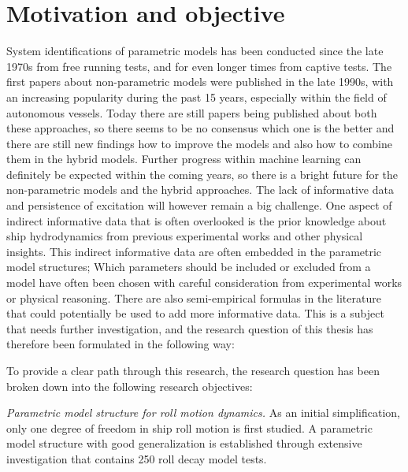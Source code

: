 \section{Motivation and objective}
\label{sec:motivation}
System identifications of parametric models has been conducted since the late 1970s from free running tests, and for even longer times from captive tests. The first papers about non-parametric models were published in the late 1990s, with an increasing popularity during the past 15 years, especially within the field of autonomous vessels. Today there are still papers being published about both these approaches, so there seems to be no consensus which one is the better and there are still new findings how to improve the models and also how to combine them in the hybrid models.
Further progress within machine learning can definitely be expected within the coming years, so there is a bright future for the non-parametric models and the hybrid approaches. The lack of informative data and persistence of excitation will however remain a big challenge. One aspect of indirect informative data that is often overlooked is the prior knowledge about ship hydrodynamics from previous experimental works and other physical insights. This indirect informative data are often embedded in the parametric model structures; Which parameters should be included or excluded from a model have often been chosen with careful consideration from experimental works or physical reasoning. There are also semi-empirical formulas in the literature that could potentially be used to add more informative data. This is a subject that needs further investigation, and the research question of this thesis has therefore been formulated in the following way: 
\begin{tcolorbox}[sharp corners,title=Research question]
    \emph{\researchquestion}
\end{tcolorbox}
To provide a clear path through this research, the research question has been broken down into the following research objectives:
\begin{tcolorbox}[sharp corners,title=Objective A]
    \emph{
        Parametric model structure for roll motion dynamics.
    }
    \tcblower
    As an initial simplification, only one degree of freedom in ship roll motion is first studied. A parametric model structure with good generalization is established through extensive investigation that contains 250 roll decay model tests.
\end{tcolorbox}

